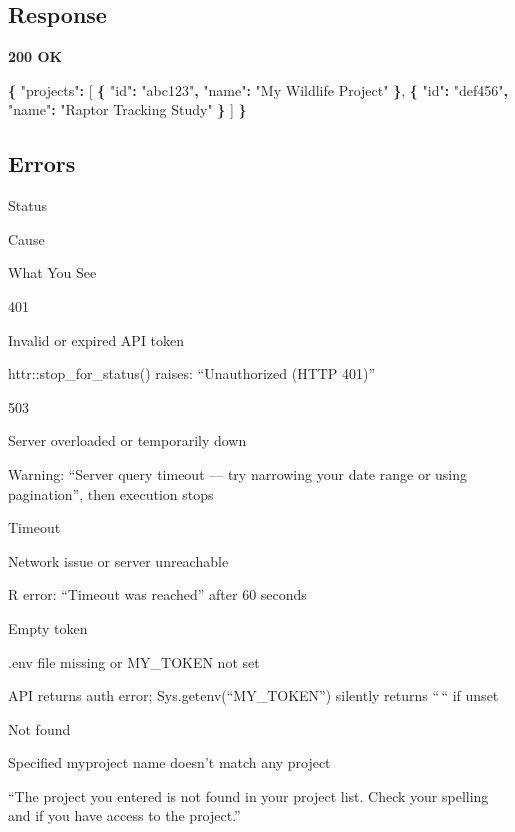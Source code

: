 \documentclass[
]{book}
\newenvironment{Shaded}{\begin{snugshade}}{\end{snugshade}}
\newcommand{\DataTypeTok}[1]{\textcolor[rgb]{0.13,0.29,0.53}{#1}}
\newcommand{\FunctionTok}[1]{\textcolor[rgb]{0.13,0.29,0.53}{\textbf{#1}}}
\newcommand{\OtherTok}[1]{\textcolor[rgb]{0.56,0.35,0.01}{#1}}
\newcommand{\StringTok}[1]{\textcolor[rgb]{0.31,0.60,0.02}{#1}}
\begin{document}
\subsection{Response}\label{response}

\textbf{200 OK}

\begin{Shaded}
\begin{Highlighting}[]
\FunctionTok{\{}
  \DataTypeTok{"projects"}\FunctionTok{:} \OtherTok{[}
    \FunctionTok{\{}
      \DataTypeTok{"id"}\FunctionTok{:} \StringTok{"abc123"}\FunctionTok{,}
      \DataTypeTok{"name"}\FunctionTok{:} \StringTok{"My Wildlife Project"}
    \FunctionTok{\}}\OtherTok{,}
    \FunctionTok{\{}
      \DataTypeTok{"id"}\FunctionTok{:} \StringTok{"def456"}\FunctionTok{,}
      \DataTypeTok{"name"}\FunctionTok{:} \StringTok{"Raptor Tracking Study"}
    \FunctionTok{\}}
  \OtherTok{]}
\FunctionTok{\}}
\end{Highlighting}
\end{Shaded}

\subsection{Errors}\label{errors}

Status

Cause

What You See

{401}

Invalid or expired API token

httr::stop\_for\_status() raises: ``Unauthorized (HTTP 401)''

{503}

Server overloaded or temporarily down

Warning: ``Server query timeout --- try narrowing your date range or using pagination'', then execution stops

{Timeout}

Network issue or server unreachable

R error: ``Timeout was reached'' after 60 seconds

{Empty token}

.env file missing or MY\_TOKEN not set

API returns auth error; Sys.getenv(``MY\_TOKEN'') silently returns ``\,`` if unset

{Not found}

Specified myproject name doesn't match any project

``The project you entered is not found in your project list. Check your spelling and if you have access to the project.''
\end{document}
